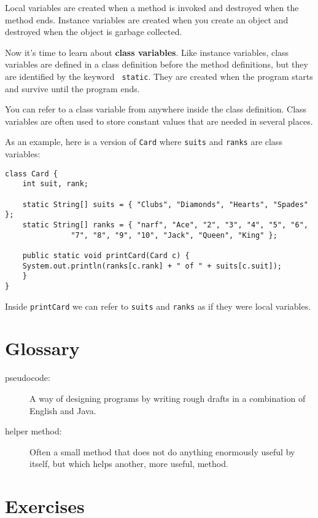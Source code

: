 \documentclass[12pt]{book}
\theoremstyle{definition}
\begin{document}
Local variables are created when a method is invoked and destroyed
when the method ends.  Instance variables are created when you
create an object and destroyed when the object is garbage collected.

Now it's time to learn about {\bf class variables}.  Like instance
variables, class variables are defined in a class definition before
the method definitions, but they are identified by the keyword {\tt
  static}.  They are created when the program starts and survive until
the program ends.

You can refer to a class variable from anywhere inside the class
definition.  Class variables are often used to store constant
values that are needed in several places.

As an example, here is a version of {\tt Card} where {\tt suits}
and {\tt ranks} are class variables:

\begin{lstlisting}
class Card {
    int suit, rank;

    static String[] suits = { "Clubs", "Diamonds", "Hearts", "Spades" };
    static String[] ranks = { "narf", "Ace", "2", "3", "4", "5", "6",
			   "7", "8", "9", "10", "Jack", "Queen", "King" };

    public static void printCard(Card c) {
	System.out.println(ranks[c.rank] + " of " + suits[c.suit]);
    }
}
\end{lstlisting}

Inside {\tt printCard} we can refer to {\tt suits} and {\tt ranks} as
if they were local variables.


\section{Glossary}

\begin{description}

\item[pseudocode:]  A way of designing programs by writing
rough drafts in a combination of English and Java.

\item[helper method:]  Often a small method that does not
do anything enormously useful by itself, but which helps
another, more useful, method.



\end{description}

\section{Exercises}
\end{document}
